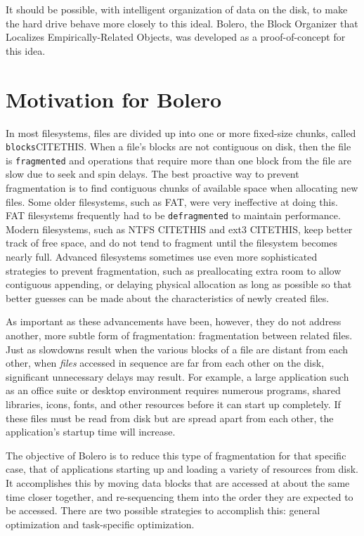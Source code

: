 \documentclass[10pt,twocolumn,letterpaper]{article}
\begin{document}
It should be possible, with intelligent organization of data on the disk, to make the hard drive behave
more closely to this ideal. Bolero, the Block Organizer that Localizes Empirically-Related Objects, was developed as a proof-of-concept for this idea.

\section{Motivation for Bolero}\label{sec:motive}

In most filesystems, files are divided up
into one or more fixed-size chunks, called \texttt{blocks}CITETHIS. When a file's blocks
are not contiguous on disk, then the file is \texttt{fragmented}
and operations that require more than one block from the file are slow due to
seek and spin delays. The best proactive way to prevent fragmentation is to find contiguous
chunks of available space when allocating new files. Some older filesystems, such as FAT, were
very ineffective at doing this\cite{fathistory}.
FAT filesystems frequently had to be \texttt{defragmented} to maintain performance.
Modern filesystems, such as NTFS CITETHIS and ext3 CITETHIS, keep better track of free space,
and do not tend to fragment until the filesystem becomes nearly full. Advanced filesystems sometimes
use even more sophisticated strategies to prevent fragmentation, such as preallocating extra room to allow 
contiguous appending, or delaying physical allocation as long as possible so that better guesses
can be made about the characteristics of newly created files\cite{xfs}.

As important as these advancements have been, however, they do not address another, more subtle form of fragmentation: fragmentation between related files.
Just as slowdowns result when the various blocks of a file are distant from each other, when \emph{files} accessed in sequence are far from each other on the disk, significant unnecessary delays may result. For example, a large application such as an office suite or desktop environment requires numerous programs, shared libraries, icons, fonts, and other resources before it can start up completely. If these files must be read from disk but are spread apart from each other, the application's startup time will increase.

The objective of Bolero is to reduce this type of fragmentation for that specific case, that of applications
starting up and loading a variety of resources from disk. It accomplishes this by moving data blocks that are accessed at about the same time closer together, and re-sequencing them into the order they are expected to be accessed. There are two possible strategies to accomplish this: general optimization and task-specific optimization.
\end{document}
